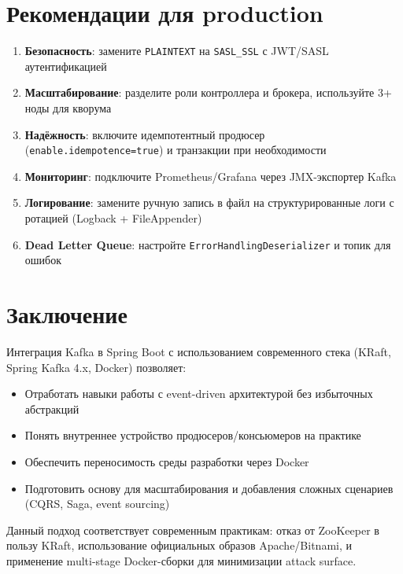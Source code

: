 \documentclass[a4paper,12pt]{article}
\begin{document}
\section{Рекомендации для production}
\begin{enumerate}
    \item \textbf{Безопасность}: замените \texttt{PLAINTEXT} на \texttt{SASL\_SSL} с JWT/SASL аутентификацией
    \item \textbf{Масштабирование}: разделите роли контроллера и брокера, используйте 3+ ноды для кворума
    \item \textbf{Надёжность}: включите идемпотентный продюсер (\texttt{enable.idempotence=true}) и транзакции при необходимости
    \item \textbf{Мониторинг}: подключите Prometheus/Grafana через JMX-экспортер Kafka
    \item \textbf{Логирование}: замените ручную запись в файл на структурированные логи с ротацией (Logback + FileAppender)
    \item \textbf{Dead Letter Queue}: настройте \texttt{ErrorHandlingDeserializer} и топик для ошибок
\end{enumerate}

\section{Заключение}
Интеграция Kafka в Spring Boot с использованием современного стека (KRaft, Spring Kafka 4.x, Docker) позволяет:
\begin{itemize}
    \item Отработать навыки работы с event-driven архитектурой без избыточных абстракций
    \item Понять внутреннее устройство продюсеров/консьюмеров на практике
    \item Обеспечить переносимость среды разработки через Docker
    \item Подготовить основу для масштабирования и добавления сложных сценариев (CQRS, Saga, event sourcing)
\end{itemize}

Данный подход соответствует современным практикам: отказ от ZooKeeper в пользу KRaft, использование официальных образов Apache/Bitnami, и применение multi-stage Docker-сборки для минимизации attack surface.
\end{document}
